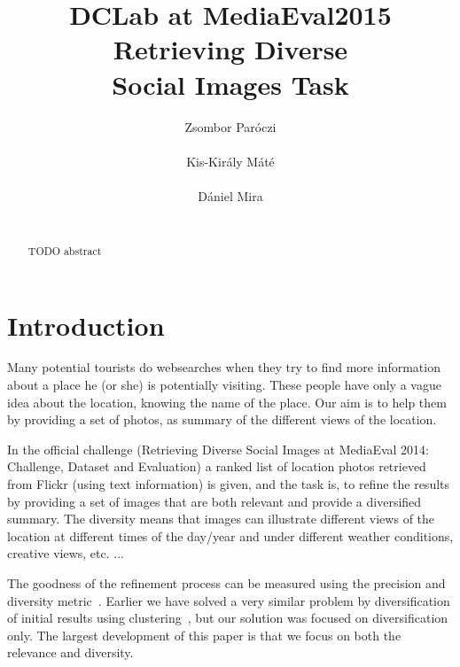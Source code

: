 \documentclass{sig-alternate}
\begin{document}

\title{DCLab at MediaEval2015 Retrieving Diverse \\ Social Images Task}


\author{
\alignauthor
Zsombor Par\'oczi\\
       \\
\alignauthor
Kis-Kir\'aly M\'at\'e \\
		\\
\alignauthor
D\'aniel Mira\\
		\\
}

\maketitle
\begin{abstract}
TODO abstract
\end{abstract}

\section{Introduction}

Many potential tourists do websearches when they try to find more information about a place he (or she) is potentially visiting. These people have only a vague idea about the location, knowing the name of the place. Our aim is to help them by providing a set of photos, as summary of the different views of the location. 

In the official challenge (Retrieving Diverse Social Images at MediaEval 2014: Challenge, Dataset and Evaluation) \cite{ionescu2014retrieving} a ranked list of location photos retrieved from Flickr (using text information) is given, and the task is, to refine the results by providing a set of images that are both relevant and provide a diversified summary. The diversity means that images can illustrate different views of the location at different times of the day/year and under different weather conditions, creative views, etc. ...

The goodness of the refinement process can be measured using the precision and diversity metric~\cite{Taneva:2010:GRP:1718487.1718541}. Earlier we have solved a very similar problem by diversification of initial results using clustering~\cite{szHucs2013bmemtm}, but our solution was focused on diversification only. The largest development of this paper is that we focus on both the relevance and diversity.
\end{document}

